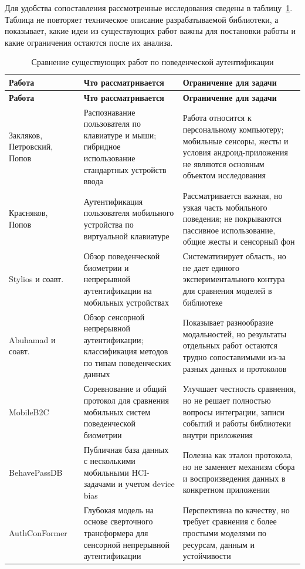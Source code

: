 \documentclass[oneside,senior,etd]{BYUPhys}
\begin{document}
Для удобства сопоставления рассмотренные исследования сведены в таблицу~\ref{tab:related-work}. Таблица не повторяет техническое описание разрабатываемой библиотеки, а показывает, какие идеи из существующих работ важны для постановки работы и какие ограничения остаются после их анализа.

\begin{longtable}{|p{}|p{}|p{}|}
\caption{Сравнение существующих работ по поведенческой аутентификации}\label{tab:related-work}\\
\hline
\textbf{Работа} & \textbf{Что рассматривается} & \textbf{Ограничение для задачи} \\
\hline
\endfirsthead
\hline
\textbf{Работа} & \textbf{Что рассматривается} & \textbf{Ограничение для задачи} \\
\hline
\endhead
Закляков, Петровский, Попов~\cite{zaklyakov2017hybrid} & Распознавание пользователя по клавиатуре и мыши; гибридное использование стандартных устройств ввода & Работа относится к персональному компьютеру; мобильные сенсоры, жесты и условия андроид-приложения не являются основным объектом исследования \\
\hline
Красняков, Попов~\cite{krasnyakov2017virtualkeyboard} & Аутентификация пользователя мобильного устройства по виртуальной клавиатуре & Рассматривается важная, но узкая часть мобильного поведения; не покрываются пассивное использование, общие жесты и сенсорный фон \\
\hline
Stylios и соавт.~\cite{stylios2021survey} & Обзор поведенческой биометрии и непрерывной аутентификации на мобильных устройствах & Систематизирует область, но не дает единого экспериментального контура для сравнения моделей в библиотеке \\
\hline
Abuhamad и соавт.~\cite{abuhamad2021contemporary} & Обзор сенсорной непрерывной аутентификации; классификация методов по типам поведенческих данных & Показывает разнообразие модальностей, но результаты отдельных работ остаются трудно сопоставимыми из-за разных данных и протоколов \\
\hline
MobileB2C~\cite{mobileb2c2022} & Соревнование и общий протокол для сравнения мобильных систем поведенческой биометрии & Улучшает честность сравнения, но не решает полностью вопросы интеграции, записи событий и работы библиотеки внутри приложения \\
\hline
BehavePassDB~\cite{behavepassdb2023} & Публичная база данных с несколькими мобильными HCI-задачами и учетом device bias & Полезна как эталон протокола, но не заменяет механизм сбора и воспроизведения данных в конкретном приложении \\
\hline
AuthConFormer~\cite{hu2023authconformer} & Глубокая модель на основе сверточного трансформера для сенсорной непрерывной аутентификации & Перспективна по качеству, но требует сравнения с более простыми моделями по ресурсам, данным и устойчивости \\
\hline
\end{longtable}
\end{document}
